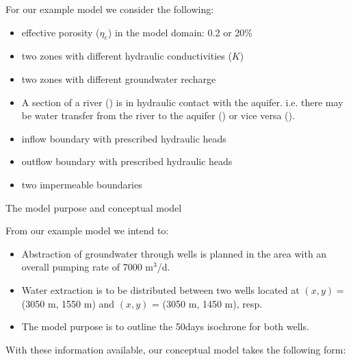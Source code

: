 \documentclass[letterpaper,10pt,english]{jupyterBook}
\begin{document}
\sphinxAtStartPar
For our example model we consider the following:
\begin{itemize}
\item {} 
\sphinxAtStartPar
effective porosity (\(\eta_e\)) in the model domain: 0.2 or 20\%

\item {} 
\sphinxAtStartPar
two zones with different hydraulic conductivities (\(K\))

\item {} 
\sphinxAtStartPar
two zones with different groundwater recharge

\item {} 
\sphinxAtStartPar
A section of a river () is in hydraulic contact with the aquifer. i.e. there may be water transfer from the river to the aquifer () or vice versa ().

\item {} 
\sphinxAtStartPar
inflow boundary with prescribed hydraulic heads

\item {} 
\sphinxAtStartPar
outflow boundary with prescribed hydraulic heads

\item {} 
\sphinxAtStartPar
two impermeable boundaries

\end{itemize}

\sphinxAtStartPar
{} \sphinxhyphen{} The model purpose and conceptual model

\sphinxAtStartPar
From our example model we intend to:
\begin{itemize}
\item {} 
\sphinxAtStartPar
Abstraction of groundwater through wells is planned in the area with an overall pumping rate of 7000 m\(^3\)/d.

\item {} 
\sphinxAtStartPar
Water extraction is to be distributed between two wells located at \((x,y) =\) (3050 m, 1550 m) and \((x,y)\) = (3050 m, 1450 m), resp.

\item {} 
\sphinxAtStartPar
The model purpose is to outline the 50\sphinxhyphen{}days isochrone for both wells.

\end{itemize}

\sphinxAtStartPar
With these information available, our conceptual model takes the following form:
\end{document}
